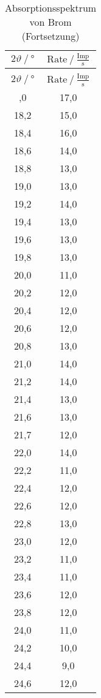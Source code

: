 \begin{longtable}{ S S }
   \caption{Absorptionsspektrum von Brom}
   \label{tab:brom} \\
    \toprule
 {$2\vartheta\:/\: \mathrm{°}$} & {$\text{Rate}\:/\: \mathrm{\frac{Imp}{s}}$} \\
    \midrule
  \endfirsthead
    \caption{Absorptionsspektrum von Brom (Fortsetzung)} \\
    \toprule
 {$2\vartheta\:/\: \mathrm{°}$} & {$\text{Rate}\:/\: \mathrm{\frac{Imp}{s}}$} \\
    \midrule
  \endhead
    \midrule
  \endfoot
    \bottomrule
  ,0 & 17,0 \\
    18,2 & 15,0 \\
    18,4 & 16,0 \\
    18,6 & 14,0 \\
    18,8 & 13,0 \\
    19,0 & 13,0 \\
    19,2 & 14,0 \\
    19,4 & 13,0 \\
    19,6 & 13,0 \\
    19,8 & 13,0 \\
    20,0 & 11,0 \\
    20,2 & 12,0 \\
    20,4 & 12,0 \\
    20,6 & 12,0 \\
    20,8 & 13,0 \\
    21,0 & 14,0 \\
    21,2 & 14,0 \\
    21,4 & 13,0 \\
    21,6 & 13,0 \\
    21,7 & 12,0 \\
    22,0 & 14,0 \\
    22,2 & 11,0 \\
    22,4 & 12,0 \\
    22,6 & 12,0 \\
    22,8 & 13,0 \\
    23,0 & 12,0 \\
    23,2 & 11,0 \\
    23,4 & 11,0 \\
    23,6 & 12,0 \\
    23,8 & 12,0 \\
    24,0 & 11,0 \\
    24,2 & 10,0 \\
    24,4 & 9,0 \\
    24,6 & 12,0 \\

\end{longtable}
